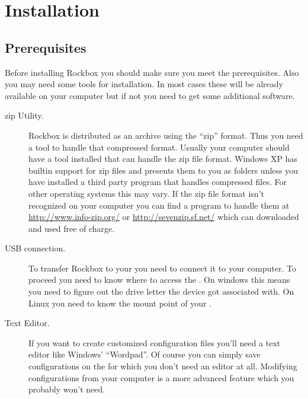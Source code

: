 \chapter{Installation}\label{sec:installation}
\section{Prerequisites}\label{sec:prerequisites}
Before installing Rockbox you should make sure you meet the prerequisites.
Also you may need some tools for installation. In most cases these will be
already available on your computer but if not you need to get some additional
software.

\begin{description}
\item[zip Utility.]
  Rockbox is distributed as an archive using the ``zip'' format. Thus you
  need a tool to handle that compressed format. Usually your
  computer should have a tool installed that can handle the zip file format.
  Windows XP has builtin support for zip files and presents them to you
  as folders unless you have installed a third party program that handles
  compressed files. For other operating systems this may vary. If the zip file
  format isn't recognized on your computer you can find a program to
  handle them at \url{http://www.info-zip.org/} or
  \url{http://sevenzip.sf.net/} which can downloaded and used free of
  charge.
\item[USB connection.]
  To transfer Rockbox to your \dap{} you need to connect it to your computer.
  To proceed you need to know where to access the \dap{}. On windows this
  means you need to figure out the drive letter the device got associated
  with. On Linux you need to know the mount point of your \dap{}.
\item[Text Editor.]
  If you want to create customized configuration files you'll need a text
  editor like Windows' ``Wordpad''. Of course you can simply save
  configurations on the \dap{} for which you don't need an editor at all.
  Modifying configurations from your computer is a more advanced feature
  which you probably won't need.
\end{description}



